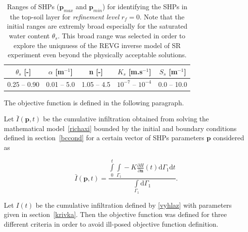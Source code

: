 \documentclass[review]{elsarticle}
\newenvironment{lineq}
    {\begin{linenomath*}
    \begin{equation}
    }
    { 
    \end{equation} 
    \end{linenomath*}
    }
\newcommand{\dd}{\mathrm{d}}
\renewcommand{\vec}{\mathbf}
\begin{document}
\begin{table}[ht]
\begin{center}
\caption{Ranges of SHPs ($\vec{p}_{max}$ and $\vec{p}_{min}$) for identifying the SHPs in the top-soil layer for {\it refinement level} $r_f=0$. Note that the initial ranges are extremly broad especially for the saturated water content $\theta_s$. This broad range was selected in order to explore the uniqnuess
of the REVG inverse model of SR experiment
 even beyond the physically acceptable solutions. }
\begin{small}
\doublespacing
\begin{tabular}{c | c| c| c| c}
\toprule
$\theta_s$ [-]&$\alpha$ [m$^{-1}$]&n [-]& $K_s$ [m.s$^{-1}$] & $S_s$ [m$^{-1}$] \\ \hline
\toprule
0.25 -- 0.90 & 0.01 -- 5.0 & 1.05 -- 4.5 & $10^{-7}$ -- $10^{-4}$ & 0.0 -- 10.0 \\
\toprule
\end{tabular}
\end{small}
\label{rozsahy}
\end{center}
\end{table}

The objective function is defined in the following paragraph.


Let $\bar{I}(\vec{p},t)$ be the cumulative infiltration obtained from solving the mathematical model~\eqref{richaxi} bounded by the initial and boundary conditions  defined in section~\ref{bccond} for a certain vector of SHPs parameters $\vec{p}$ considered as
\begin{lineq}\bar{I}(\vec{p},t) = \frac{\int\limits_0^t \int\limits_{\Gamma_1}-K \frac{\partial H}{\partial \vec{n}}(t)  \dd \Gamma_1 \dd t}{\int\limits_{\Gamma_1} \dd \Gamma_1}.\end{lineq}
Let $I(t)$ be the cumulative infiltration defined by \eqref{vyhlaz} with parameters given in section~\ref{krivka}. 
Then the objective function was defined for three different criteria in order to avoid ill-posed objective function definition.
\end{document}
